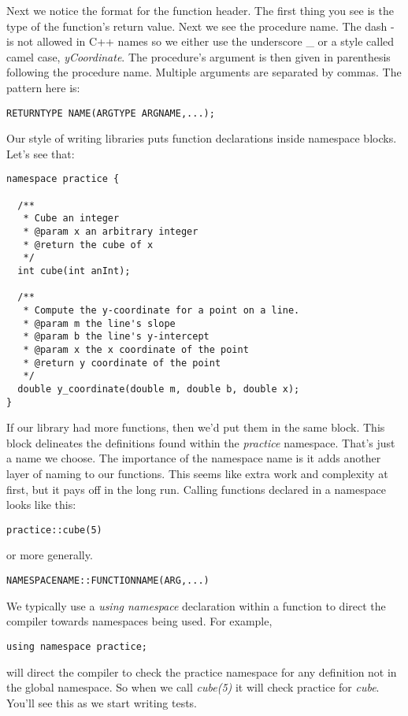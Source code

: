 \documentclass[]{tufte-handout}
\begin{document}
Next we notice the format for the function header. The first thing you see is the type of the function's return value.  Next we see the procedure name. The dash - is not allowed in C++ names so we either use the underscore \_ or a style called camel case, \textit{yCoordinate}. The procedure's argument is then given in parenthesis following the procedure name. Multiple arguments are separated by commas. The pattern here is:
\begin{verbatim}
RETURNTYPE NAME(ARGTYPE ARGNAME,...);
\end{verbatim} 


Our style of writing libraries puts function declarations inside namespace blocks. Let's see that:
\begin{verbatim}
namespace practice {

  /**
   * Cube an integer
   * @param x an arbitrary integer
   * @return the cube of x
   */
  int cube(int anInt);

  /**
   * Compute the y-coordinate for a point on a line.
   * @param m the line's slope
   * @param b the line's y-intercept
   * @param x the x coordinate of the point
   * @return y coordinate of the point 
   */
  double y_coordinate(double m, double b, double x);
}
\end{verbatim}

If our library had more functions, then we'd put them in the same block. This block delineates the definitions found within the \textit{practice} namespace.  That's just a name we choose.  The importance of the namespace name is it adds another layer of naming to our functions. This seems like extra work and complexity at first, but it pays off in the long run. Calling functions declared in a namespace looks like this:
\begin{verbatim}
practice::cube(5)
\end{verbatim}
or more generally.
\begin{verbatim}
NAMESPACENAME::FUNCTIONNAME(ARG,...)
\end{verbatim}

We typically use a \textit{using namespace} declaration within a function to direct the compiler towards namespaces being used. For example,
\begin{verbatim}
using namespace practice;
\end{verbatim}
will direct the compiler to check the practice namespace for any definition not in the global namespace. So when we call \textit{cube(5)} it will check practice for \textit{cube}. You'll see this as we start writing tests.
\end{document}
